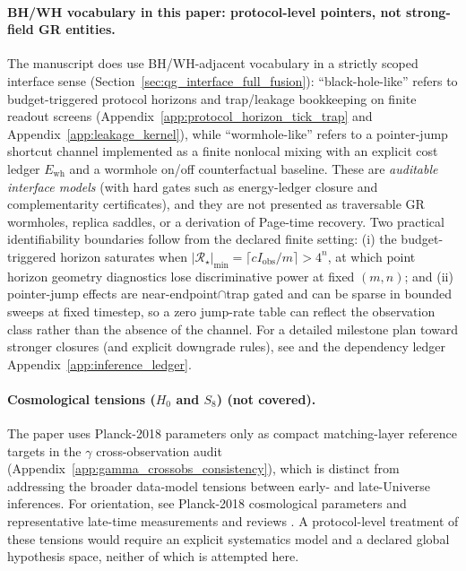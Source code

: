 \paragraph{BH/WH vocabulary in this paper: protocol-level pointers, not strong-field GR entities.}
\AuditTag The manuscript does use BH/WH-adjacent vocabulary in a strictly scoped interface sense (Section~\ref{sec:qg_interface_full_fusion}):
``black-hole-like'' refers to budget-triggered protocol horizons and trap/leakage bookkeeping on finite readout screens (Appendix~\ref{app:protocol_horizon_tick_trap} and Appendix~\ref{app:leakage_kernel}),
while ``wormhole-like'' refers to a pointer-jump shortcut channel implemented as a finite nonlocal mixing with an explicit cost ledger $E_{\mathrm{wh}}$ and a wormhole on/off counterfactual baseline.
These are \emph{auditable interface models} (with hard gates such as energy-ledger closure and complementarity certificates), and they are not presented as traversable GR wormholes, replica saddles, or a derivation of Page-time recovery.
\AuditTag Two practical identifiability boundaries follow from the declared finite setting: (i) the budget-triggered horizon saturates when $|{\mathcal R}_\star|_{\min}=\lceil cI_{\mathrm{obs}}/m\rceil>4^n$, at which point horizon geometry diagnostics lose discriminative power at fixed $(m,n)$; and (ii) pointer-jump effects are near-endpoint$\cap$trap gated and can be sparse in bounded sweeps at fixed timestep, so a zero jump-rate table can reflect the observation class rather than the absence of the channel.
\AuditTag For a detailed milestone plan toward stronger closures (and explicit downgrade rules), see  and the dependency ledger Appendix~\ref{app:inference_ledger}.

\paragraph{Cosmological tensions ($H_0$ and $S_8$) (not covered).}
The paper uses Planck-2018 parameters only as compact matching-layer reference targets in the $\gamma$ cross-observation audit (Appendix~\ref{app:gamma_crossobs_consistency}),
which is distinct from addressing the broader data-model tensions between early- and late-Universe inferences.
For orientation, see Planck-2018 cosmological parameters \cite{Planck2018Parameters,Planck2018Parameters2020AandA} and representative late-time measurements and reviews \cite{Riess2019SH0ES,RiessEtAl2022SH0ESApJL,AsgariEtAl2021KiDS1000CosmicShear,DESY3Cosmo2022PRD,VerdeTreuRiess2019TensionsReview}.
A protocol-level treatment of these tensions would require an explicit systematics model and a declared global hypothesis space, neither of which is attempted here.

